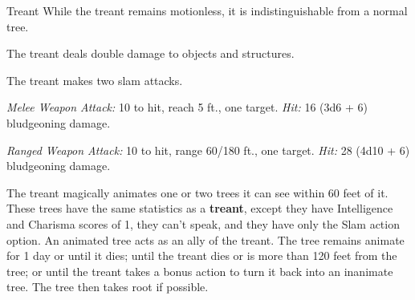 \documentclass[10pt,a4paper,twoside,bg=print,twocolumn,openany,nodeprecatedcode]{dndbook}
\begin{document}
\clearpage

\begin{DndMonster}[float=t]{Treant}
\DndMonsterBasics[
armor-class = {16 (natural armor)},
hit-points = {\DndDice{12d12 + 60}},
speed = {30 ft.}
]
\DndMonsterAbilityScores[
 str = 23,
 dex = 8,
 con = 21,
 int = 12,
 wis = 16,
 cha = 12
]
\DndMonsterDetails[
damage-vulnerabilities = {fire},
damage-resistances = {bludgeoning, piercing},
languages = {Common, Druidic, Elvish, Sylvan},
challenge = 9,
]
While the treant remains motionless, it is indistinguishable from a normal tree.

The treant deals double damage to objects and structures.

The treant makes two slam attacks.

\textsl{Melee Weapon Attack:} 10 to hit, reach 5 ft., one target. \textsl{Hit:} 16 (3d6 + 6) bludgeoning damage.

\textsl{Ranged Weapon Attack:} 10 to hit, range 60/180 ft., one target. \textsl{Hit:} 28 (4d10 + 6) bludgeoning damage.

The treant magically animates one or two trees it can see within 60 feet of it. These trees have the same statistics as a \textbf{treant}, except they have Intelligence and Charisma scores of 1, they can't speak, and they have only the Slam action option. An animated tree acts as an ally of the treant. The tree remains animate for 1 day or until it dies; until the treant dies or is more than 120 feet from the tree; or until the treant takes a bonus action to turn it back into an inanimate tree. The tree then takes root if possible.

\end{DndMonster}
\end{document}
